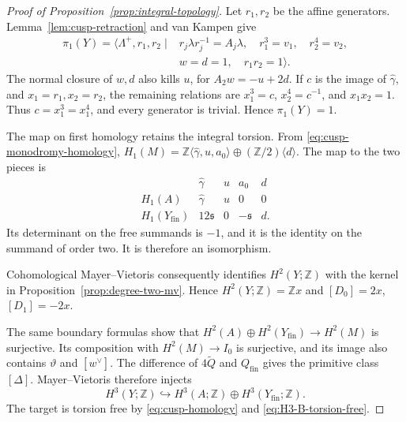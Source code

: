 \begin{proof}[Proof of Proposition~\ref{prop:integral-topology}]
Let $r_1,r_2$ be the affine generators.  Lemma~\ref{lem:cusp-retraction}
and van Kampen give
\[
 \begin{split}
 \pi_1(Y)=\langle\Lambda^+,r_1,r_2\mid{}&
 r_j\lambda r_j^{-1}=A_j\lambda,
 \quad r_1^3=v_1,\quad r_2^4=v_2,\\
 &w=d=1,\quad r_1r_2=1\rangle.
 \end{split}
\]
The normal closure of $w,d$ also kills $u$, for
$A_2w=-u+2d$.  If $c$ is the image of $\widehat\gamma$, and
$x_1=r_1,x_2=r_2$, the remaining relations are
$x_1^3=c$, $x_2^4=c^{-1}$, and $x_1x_2=1$.
Thus $c=x_1^3=x_1^4$, and every generator is trivial.  Hence
$\pi_1(Y)=1$.

The map on first homology retains the integral torsion.  From
\eqref{eq:cusp-monodromy-homology},
$H_1(M)=\mathbb Z\langle\widehat\gamma,u,a_0\rangle
\oplus(\mathbb Z/2)\langle d\rangle$.
The map to the two pieces is
\begin{equation*}
 \begin{array}{c|cccc}
  &\widehat\gamma&u&a_0&d\\ \hline
 H_1(A)&\widehat\gamma&u&0&0\\
 H_1(Y_{\mathrm{fin}})&12\mathfrak s&0&-\mathfrak s&d.
 \end{array}
\end{equation*}
Its determinant on the free summands is $-1$, and it is the identity on
the summand of order two.  It is therefore an isomorphism.

Cohomological Mayer--Vietoris consequently identifies $H^2(Y;\mathbb Z)$
with the kernel in
Proposition~\ref{prop:degree-two-mv}.  Hence
$H^2(Y;\mathbb Z)=\mathbb Zx$ and
$[D_0]=2x$, $[D_1]=-2x$.

The same boundary formulas show that
$H^2(A)\oplus H^2(Y_{\mathrm{fin}})\to H^2(M)$ is surjective.  Its
composition with $H^2(M)\to I_0$ is surjective, and its image also contains
$\vartheta$ and $[w^\vee]$.  The difference of
$4\widetilde Q$ and $Q_{\mathrm{fin}}$ gives the primitive class
$[\Delta]$.  Mayer--Vietoris therefore injects
\begin{equation}\label{eq:H3-Y-injection}
 H^3(Y;\mathbb Z)\hookrightarrow
 H^3(A;\mathbb Z)\oplus H^3(Y_{\mathrm{fin}};\mathbb Z).
\end{equation}
The target is torsion free by \eqref{eq:cusp-homology} and
\eqref{eq:H3-B-torsion-free}.


\end{proof}
